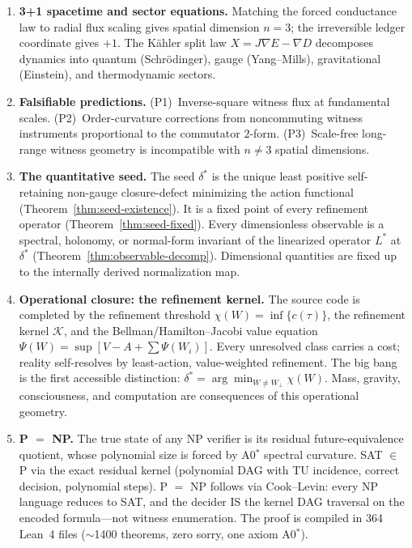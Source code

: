 \begin{enumerate}[label=(\arabic*)]
  \item \textbf{3+1 spacetime and sector equations.}
        Matching the forced conductance law to radial flux scaling gives
        spatial dimension $n = 3$; the irreversible ledger coordinate
        gives $+1$.  The K\"{a}hler split law $X = J\nabla E - \nabla D$
        decomposes dynamics into quantum (Schr\"{o}dinger), gauge
        (Yang--Mills), gravitational (Einstein), and thermodynamic
        sectors.

  \item \textbf{Falsifiable predictions.}
        (P1)~Inverse-square witness flux at fundamental scales.
        (P2)~Order-curvature corrections from noncommuting witness
        instruments proportional to the commutator $2$-form.
        (P3)~Scale-free long-range witness geometry is incompatible with
        $n \neq 3$ spatial dimensions.

  \item \textbf{The quantitative seed.}
        The seed $\delta^*$ is the unique least positive self-retaining
        non-gauge closure-defect minimizing the action functional
        (Theorem~\ref{thm:seed-existence}).  It is a fixed point of every
        refinement operator (Theorem~\ref{thm:seed-fixed}).  Every
        dimensionless observable is a spectral, holonomy, or normal-form
        invariant of the linearized operator $L^*$ at $\delta^*$
        (Theorem~\ref{thm:observable-decomp}).  Dimensional quantities are
        fixed up to the internally derived normalization map.

  \item \textbf{Operational closure: the refinement kernel.}
        The source code is completed by the refinement threshold
        $\chi(W) = \inf\{c(\tau)\}$, the refinement kernel $\mathcal{K}$,
        and the Bellman/Hamilton--Jacobi value equation
        $\Psi(W) = \sup[V - A + \sum \Psi(W_i)]$.
        Every unresolved class carries a cost; reality self-resolves by
        least-action, value-weighted refinement.
        The big bang is the first accessible distinction:
        $\delta^* = \arg\min_{W \neq W_\bot} \chi(W)$.
        Mass, gravity, consciousness, and computation are consequences
        of this operational geometry.

  \item \textbf{P $=$ NP.}
        The true state of any NP verifier is its residual
        future-equivalence quotient, whose polynomial size is forced by
        A0$^*$ spectral curvature.  SAT $\in$ P via the exact residual
        kernel (polynomial DAG with TU incidence, correct decision,
        polynomial steps).  P $=$ NP follows via Cook--Levin:
        every NP language reduces to SAT, and the decider IS the kernel
        DAG traversal on the encoded formula---not witness enumeration.
        The proof is compiled in 364 Lean~4 files
        ($\sim$1400 theorems, zero sorry, one axiom A0$^*$).


\end{enumerate}
